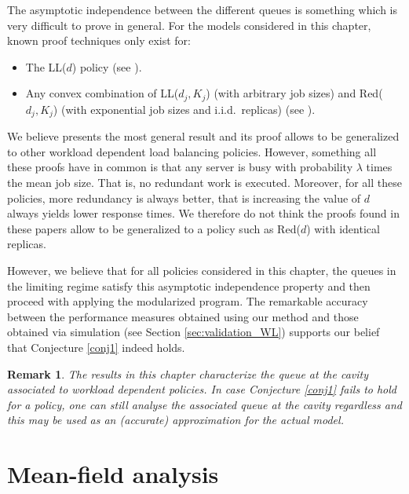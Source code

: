 \documentclass[12pt]{report}
\newtheorem{remark}{Remark}
\begin{document}
The asymptotic independence between the different queues is something which is very difficult to prove in general. For the models considered in this chapter, known proof techniques only exist for:
\begin{itemize}
\item The LL($d$) policy (see \cite{bramsonLB_QUESTA}).
\item Any convex combination of LL($d_j, K_j$) (with arbitrary job sizes) and Red($d_j, K_j$) (with exponential job sizes and i.i.d.~replicas) (see \cite{shneer2020large}).
\end{itemize}
We believe \cite{shneer2020large} presents the most general result and its proof allows to be generalized to other workload dependent load balancing policies. However, something all these proofs have in common is that any server is busy with probability $\lambda$ times the mean job size. That is, no redundant work is executed. Moreover, for all these policies, more redundancy is always better, that is increasing the value of $d$ always yields lower response times. We therefore do not think the proofs found in these papers allow to be generalized to a policy such as Red($d$) with identical replicas.

 However, we believe that for all policies considered in this chapter, the queues in the limiting regime satisfy this asymptotic independence property and then proceed with applying the modularized program. The remarkable accuracy between the performance measures obtained using our method and those obtained via simulation (see Section \ref{sec:validation_WL}) supports our belief that Conjecture \ref{conj1} indeed holds.

\begin{remark}
The results in this chapter characterize the queue at the cavity associated to workload dependent policies. In case Conjecture \ref{conj1} fails to hold for a policy, one can still analyse the associated queue at the cavity regardless and this may be used as an (accurate) approximation for the actual model.
\end{remark}


%
\section{Mean-field analysis}\label{sec:mean_field}
\end{document}
